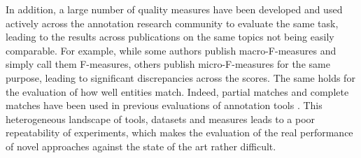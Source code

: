 In addition, a large number of quality measures have been developed and used actively across the annotation research community to evaluate the same task, leading to the results across publications on the same topics not being easily comparable. For example, while some authors publish macro-F-measures and simply call them F-measures, others publish micro-F-measures for the same purpose, leading to significant discrepancies across the scores. The same holds for the evaluation of how well entities match. Indeed, partial matches and complete matches have been used in previous evaluations of annotation tools \cite{cornolti,FOX}. This heterogeneous landscape of tools, datasets and measures leads to a poor repeatability of experiments, which makes the evaluation of the real performance of novel approaches against the state of the art rather difficult.

